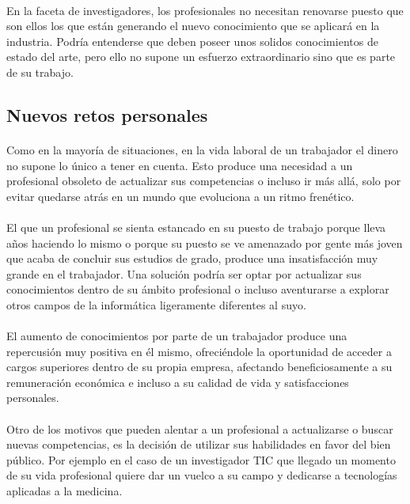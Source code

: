 \documentclass[12pt, a4paper]{report}
\begin{document}
                \paragraph{}
                En la faceta de investigadores, los profesionales no necesitan renovarse puesto que son ellos los que están generando el nuevo conocimiento que se aplicará en la industria. Podría entenderse que deben poseer unos solidos conocimientos de estado del arte, pero ello no supone un esfuerzo extraordinario sino que es parte de su trabajo.
                
    	\subsection{Nuevos retos personales}
        	\paragraph{}
            Como en la mayoría de situaciones, en la vida laboral de un trabajador el dinero no supone lo único a tener en cuenta. Esto produce una necesidad a un profesional obsoleto de actualizar sus competencias o incluso ir más allá, solo por evitar quedarse atrás en un mundo que evoluciona a un ritmo frenético.
            
            \paragraph{}
			El que un profesional se sienta estancado en su puesto de trabajo porque lleva años haciendo lo mismo o porque su puesto se ve amenazado por gente más joven que acaba de concluir sus estudios de grado, produce una insatisfacción muy grande en el trabajador. Una solución podría ser optar por actualizar sus conocimientos dentro de su ámbito profesional o incluso aventurarse a explorar otros campos de la informática ligeramente diferentes al suyo.

			\paragraph{}
			El aumento de conocimientos por parte de un trabajador produce una repercusión muy positiva en él mismo, ofreciéndole la oportunidad de acceder a cargos superiores dentro de su propia empresa, afectando beneficiosamente a su remuneración económica e incluso a su calidad de vida y satisfacciones personales.
			
            \paragraph{}
			Otro de los motivos que pueden alentar a un profesional a actualizarse o buscar nuevas competencias, es la decisión de utilizar sus habilidades en favor del bien público. Por ejemplo en el caso de un investigador TIC que llegado un momento de su vida profesional quiere dar un vuelco a su campo y dedicarse a tecnologías aplicadas a la medicina.
\end{document}
